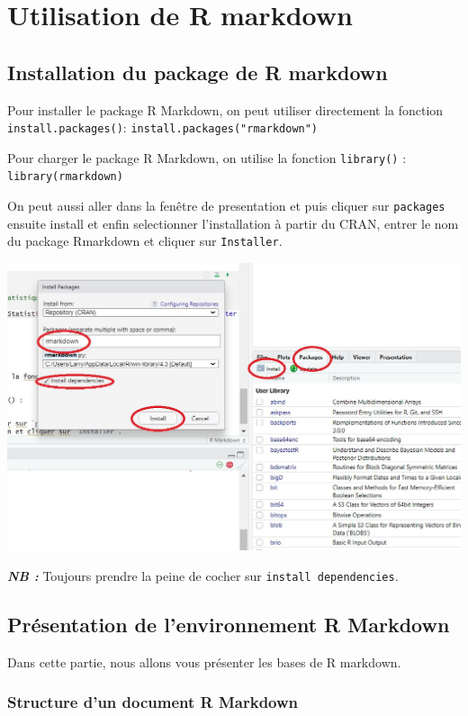 \documentclass[
  12pt,
]{article}
\begin{document}
\newpage

\section{Utilisation de R markdown}\label{utilisation-de-r-markdown}

\subsection{Installation du package de R
markdown}\label{installation-du-package-de-r-markdown}

Pour installer le package R Markdown, on peut utiliser directement la
fonction \texttt{install.packages()}:
\texttt{install.packages("rmarkdown")}

Pour charger le package R Markdown, on utilise la fonction
\texttt{library()} : \texttt{library(rmarkdown)}

On peut aussi aller dans la fenêtre de presentation et puis cliquer sur
\texttt{packages} ensuite install et enfin selectionner l'installation à
partir du CRAN, entrer le nom du package Rmarkdown et cliquer sur
\texttt{Installer}.

\begin{center}\includegraphics[width=0.6\linewidth,height=0.6\textheight]{../Document_Rmarkdown/Images/Installation_package_Rmd} \end{center}

\textbf{\emph{NB :}} Toujours prendre la peine de cocher sur
\texttt{install\ dependencies}.

\subsection{Présentation de l'environnement R
Markdown}\label{pruxe9sentation-de-lenvironnement-r-markdown}

Dans cette partie, nous allons vous présenter les bases de R markdown.

\subsubsection{Structure d'un document R
Markdown}\label{structure-dun-document-r-markdown}
\end{document}
